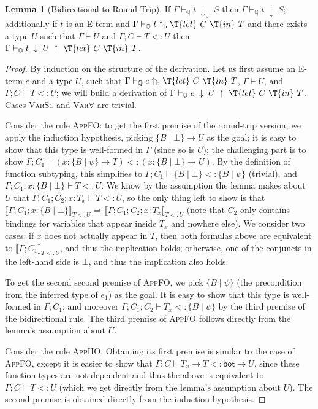 \documentclass[10pt,preprint]{sigplanconf-pldi16}
\theoremstyle{definition}
\newtheorem{lemma}{Lemma}
\newcommand{\Implies}{\Rightarrow}
\newcommand{\Subt}{<:}
\newcommand{\env}{\Gamma}
\newcommand{\produce}{\;\uparrow\;}
\newcommand{\consume}{\;\downarrow\;}
\newcommand{\produceB}{\;{\mathrm{\uparrow_b}}\;}
\newcommand{\consumeB}{\;{\mathrm{\downarrow_b}}\;}
\newcommand{\funT}[3]{{#1}\colon {#2} \to {#3}}
\newcommand{\tbot}{\mathsf{bot}}
\newcommand{\contT}[2]{\T{let}\ {#1}\ \T{in}\ {#2}}
\newcommand{\quals}{\mathbb{Q}}
\newcommand{\entailsQ}{\vdash_{\quals}}
\begin{document}
\begin{lemma}[Bidirectional to Round-Trip]\label{lemma:bidir-to-rt}
If $\env \entailsQ t \consumeB S$ then $\env \entailsQ t \consume S$;
additionally if $t$ is an E-term and $\env\entailsQ t \produceB \contT{C}{T}$ 
and there exists a type $U$ such that $\env\vdash U$ and $\env;C\vdash T\Subt U$
then $\env \entailsQ t \consume U \produce \contT{C}{T}$.
\end{lemma}
\begin{proof}
By induction on the structure of the derivation.
Let us first assume an E-term $e$ and a type $U$, 
such that $\env \entailsQ e \produceB \contT{C}{T}$, $\env\vdash U$, and $\env;C\vdash T\Subt U$;
we will build a derivation of $\env \entailsQ e \consume U \produce \contT{C}{T}$.
Cases \textsc{VarSc} and \textsc{Var$\forall$} are trivial.

Consider the rule \textsc{AppFO}:
to get the first premise of the round-trip version, we apply the induction hypothesis,
picking $\{B\mid \bot\}\to U$ as the goal;
it is easy to show that this type is well-formed in $\env$ (since so is $U$);
the challenging part is to show $\env;C_1\vdash (\funT{x}{\{B\mid \psi\}}{T}) \Subt (\funT{x}{\{B\mid \bot\}}{U})$.
By the definition of function subtyping,
this simplifies to $\env;C_1\vdash \{B\mid \bot\} \Subt \{B\mid \psi\}$ (trivial),
and $\env;C_1;x:\{B\mid \bot\}\vdash T\Subt U$.
We know by the assumption the lemma makes about $U$ that $\env;C_1;C_2;x:T_x\vdash T\Subt U$,
so the only thing left to show is that 
$\llbracket\env;C_1;x:\{B\mid \bot\}\rrbracket_{T\Subt U} \Implies \llbracket\env;C_1;C_2;x:T_x\rrbracket_{T\Subt U}$
(note that $C_2$ only contains bindings for variables that appear inside $T_x$ and nowhere else).
We consider two cases: if $x$ does not actually appear in $T$,
then both formulas above are equivalent to $\llbracket\env;C_1\rrbracket_{T\Subt U}$, and thus the implication holds;
otherwise, one of the conjuncts in the left-hand side is $\bot$, and thus the implication also holds.

To get the second second premise of \textsc{AppFO},
we pick $\{B\mid \psi\}$ (the precondition from the inferred type of $e_1$) as the goal.
It is easy to show that this type is well-formed in $\env;C_1$; 
and moreover $\env;C_1;C_2\vdash T_x \Subt \{B\mid \psi\}$ by the third premise of the bidirectional rule.
The third premise of \textsc{AppFO} follows directly from the lemma's assumption about $U$.

Consider the rule \textsc{AppHO}.
Obtaining its first premise is similar to the case of \textsc{AppFO},
except it is easier to show that $\env;C\vdash T_x\to T \Subt \tbot\to U$,
since these function types are not dependent and thus the above is equivalent to $\env;C\vdash T \Subt U$
(which we get directly from the lemma's assumption about $U$).
The second premise is obtained directly from the induction hypothesis.


\end{proof}
\end{document}
